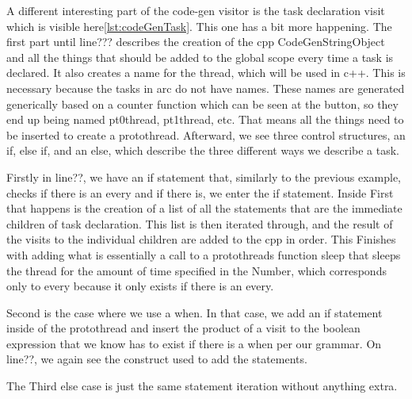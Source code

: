 A different interesting part of the code-gen visitor is the task declaration visit which is visible here\ref{lst:codeGenTask}.
This one has a bit more happening. The first part until line??? describes the creation of the cpp CodeGenStringObject and all the things that should be added to the global scope every time a task is declared. It also creates a name for the thread, which will be used in c++. This is necessary because the tasks in arc do not have names. These names are generated generically based on a counter function which can be seen at the button, so they end up being named pt0thread, pt1thread, etc.
That means all the things need to be inserted to create a protothread. Afterward, we see three control structures, an if, else if, and an else, which describe the three different ways we describe a task.

Firstly in line??, we have an if statement that, similarly to the previous example, checks if there is an every and if there is, we enter the if statement. Inside First that happens is the creation of a list of all the statements that are the immediate children of task declaration. This list is then iterated through, and the result of the visits to the individual children are added to the cpp in order. This Finishes with adding what is essentially a call to a protothreads function sleep that sleeps the thread for the amount of time specified in the Number, which corresponds only to every because it only exists if there is an every.

Second is the case where we use a when. In that case, we add an if statement inside of the protothread and insert the product of a visit to the boolean expression that we know has to exist if there is a when per our grammar. On line??, we again see the construct used to add the statements.

The Third else case is just the same statement iteration without anything extra.


